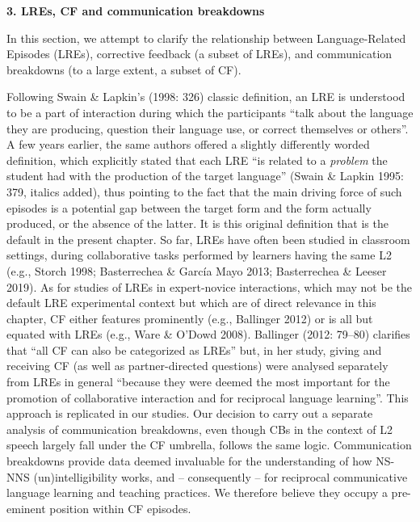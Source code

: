 \documentclass[12pt]{article}
\newenvironment{styleStandard}{\setlength\leftskip{0cm}\setlength\rightskip{0cm plus 1fil}\setlength\parindent{0cm}\setlength\parfillskip{0pt plus 1fil}\setlength\parskip{0cm plus 1pt}\writerlistparindent\writerlistleftskip\leavevmode\normalfont\normalsize\writerlistlabel\ignorespaces}{\unskip\vspace{0cm plus 1pt}\par}
\newcommand\writerlistleftskip{}
\newcommand\writerlistparindent{}
\newcommand\writerlistlabel{}
\begin{document}
\begin{styleStandard}
\textbf{3. LREs, CF and communication breakdowns}
\end{styleStandard}

\begin{styleStandard}
In this section, we attempt to clarify the relationship between Language-Related Episodes (LREs), corrective feedback (a subset of LREs), and communication breakdowns (to a large extent, a subset of CF). 
\end{styleStandard}

\begin{styleStandard}
Following Swain \& Lapkin’s (1998: 326) classic definition, an LRE is understood to be a part of interaction during which the participants “talk about the language they are producing, question their language use, or correct themselves or others”. A few years earlier, the same authors offered a slightly differently worded definition, which explicitly stated that each LRE “is related to a \textit{problem} the student had with the production of the target language” (Swain \& Lapkin 1995: 379, italics added), thus pointing to the fact that the main driving force of such episodes is a potential gap between the target form and the form actually produced, or the absence of the latter. It is this original definition that is the default in the present chapter. So far, LREs have often been studied in classroom settings, during collaborative tasks performed by learners having the same L2 (e.g., Storch 1998; Basterrechea \& García Mayo 2013; Basterrechea \& Leeser 2019). As for studies of LREs in expert-novice interactions, which may not be the default LRE experimental context but which are of direct relevance in this chapter, CF either features prominently (e.g., Ballinger 2012) or is all but equated with LREs (e.g., Ware \& O’Dowd 2008). Ballinger (2012: 79–80) clarifies that “all CF can also be categorized as LREs” but, in her study, giving and receiving CF (as well as partner-directed questions) were analysed separately from LREs in general “because they were deemed the most important for the promotion of collaborative interaction and for reciprocal language learning”. This approach is replicated in our studies. Our decision to carry out a separate analysis of communication breakdowns, even though CBs in the context of L2 speech largely fall under the CF umbrella, follows the same logic. Communication breakdowns provide data deemed invaluable for the understanding of how NS-NNS (un)intelligibility works, and – consequently – for reciprocal communicative language learning and teaching practices. We therefore believe they occupy a pre-eminent position within CF episodes.
\end{styleStandard}
\end{document}
